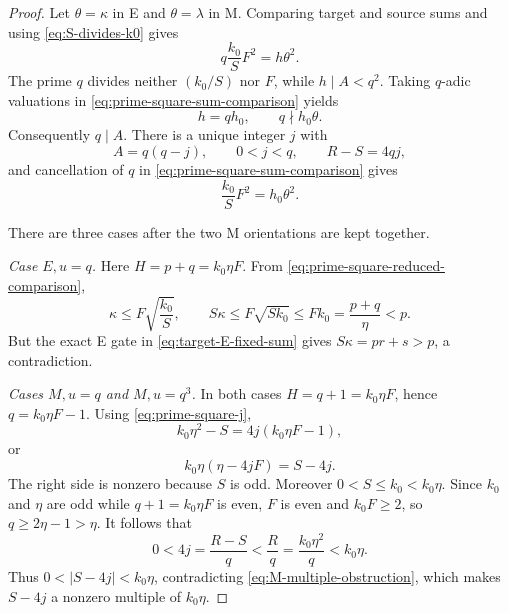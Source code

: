 \begin{proof}
Let $\theta=\kappa$ in E and $\theta=\lambda$ in M.  Comparing target and
source sums and using \eqref{eq:S-divides-k0} gives
\begin{equation}\label{eq:prime-square-sum-comparison}
 q\frac{k_0}{S}F^2=h\theta^2.
\end{equation}
The prime $q$ divides neither $(k_0/S)$ nor $F$, while $h\mid A<q^2$.
Taking $q$-adic valuations in
\eqref{eq:prime-square-sum-comparison} yields
\[
 h=qh_0,\qquad q\nmid h_0\theta.
\]
Consequently $q\mid A$.  There is a unique integer $j$ with
\begin{equation}\label{eq:prime-square-j}
 A=q(q-j),\qquad 0<j<q,\qquad R-S=4qj,
\end{equation}
and cancellation of $q$ in
\eqref{eq:prime-square-sum-comparison} gives
\begin{equation}\label{eq:prime-square-reduced-comparison}
 \frac{k_0}{S}F^2=h_0\theta^2.
\end{equation}

There are three cases after the two M orientations are kept together.

\emph{Case $E,u=q$.}
Here $H=p+q=k_0\eta F$.  From
\eqref{eq:prime-square-reduced-comparison},
\[
 \kappa\le F\sqrt{\frac{k_0}{S}},
 \qquad
 S\kappa\le F\sqrt{Sk_0}\le Fk_0
 =\frac{p+q}{\eta}<p.
\]
But the exact E gate in \eqref{eq:target-E-fixed-sum} gives
$S\kappa=pr+s>p$, a contradiction.

\emph{Cases $M,u=q$ and $M,u=q^3$.}
In both cases $H=q+1=k_0\eta F$, hence $q=k_0\eta F-1$.
Using \eqref{eq:prime-square-j},
\[
 k_0\eta^2-S=4j(k_0\eta F-1),
\]
or
\begin{equation}\label{eq:M-multiple-obstruction}
 k_0\eta(\eta-4jF)=S-4j.
\end{equation}
The right side is nonzero because $S$ is odd.  Moreover
$0<S\le k_0<k_0\eta$.  Since $k_0$ and $\eta$ are odd while
$q+1=k_0\eta F$ is even, $F$ is even and $k_0F\ge2$, so
$q\ge2\eta-1>\eta$.  It follows that
\[
 0<4j=\frac{R-S}{q}<\frac Rq
 =\frac{k_0\eta^2}{q}<k_0\eta.
\]
Thus $0<|S-4j|<k_0\eta$, contradicting
\eqref{eq:M-multiple-obstruction}, which makes $S-4j$ a nonzero multiple of
$k_0\eta$.


\end{proof}
